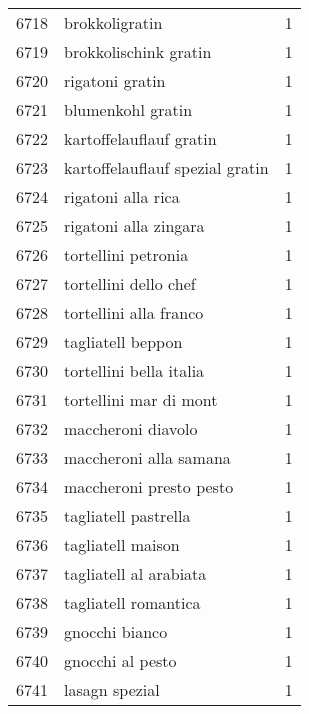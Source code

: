 \begin{tabular}{llr}
6718 &                                     brokkoligratin &      1 \\
6719 &                              brokkolischink gratin &      1 \\
6720 &                                    rigatoni gratin &      1 \\
6721 &                                  blumenkohl gratin &      1 \\
6722 &                            kartoffelauflauf gratin &      1 \\
6723 &                    kartoffelauflauf spezial gratin &      1 \\
6724 &                                 rigatoni alla rica &      1 \\
6725 &                              rigatoni alla zingara &      1 \\
6726 &                                tortellini petronia &      1 \\
6727 &                              tortellini dello chef &      1 \\
6728 &                             tortellini alla franco &      1 \\
6729 &                                  tagliatell beppon &      1 \\
6730 &                            tortellini bella italia &      1 \\
6731 &                             tortellini mar di mont &      1 \\
6732 &                                 maccheroni diavolo &      1 \\
6733 &                             maccheroni alla samana &      1 \\
6734 &                            maccheroni presto pesto &      1 \\
6735 &                               tagliatell pastrella &      1 \\
6736 &                                  tagliatell maison &      1 \\
6737 &                             tagliatell al arabiata &      1 \\
6738 &                               tagliatell romantica &      1 \\
6739 &                                     gnocchi bianco &      1 \\
6740 &                                   gnocchi al pesto &      1 \\
6741 &                                     lasagn spezial &      1 \\

\end{tabular}
